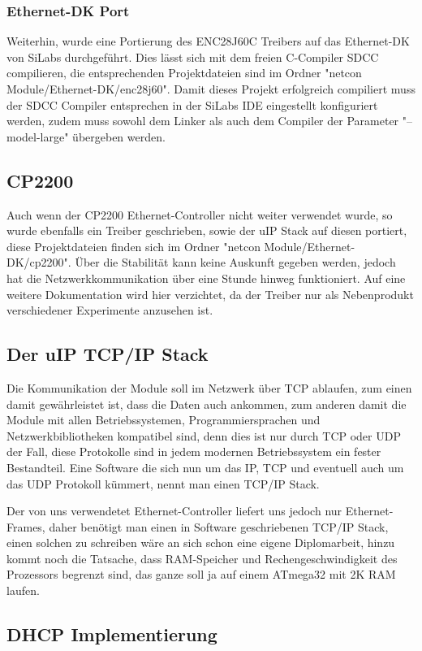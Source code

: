 \documentclass[a4paper,14pt,headsepline]{scrartcl}
\begin{document}
\subsubsection{Ethernet-DK Port}
Weiterhin, wurde eine Portierung des ENC28J60C Treibers auf das Ethernet-DK von SiLabs durchgeführt. Dies lässt sich mit dem freien C-Compiler SDCC compilieren, die entsprechenden Projektdateien sind im Ordner "netcon Module/Ethernet-DK/enc28j60". Damit dieses Projekt erfolgreich compiliert muss der SDCC Compiler entsprechen in der SiLabs IDE eingestellt konfiguriert werden, zudem muss sowohl dem Linker als auch dem Compiler der Parameter "--model-large" übergeben werden.

\subsection{CP2200}
Auch wenn der CP2200 Ethernet-Controller nicht weiter verwendet wurde, so wurde ebenfalls ein Treiber geschrieben, sowie der uIP Stack auf diesen portiert, diese Projektdateien finden sich im Ordner "netcon Module/Ethernet-DK/cp2200". Über die Stabilität kann keine Auskunft gegeben werden, jedoch hat die Netzwerkkommunikation über eine Stunde hinweg funktioniert. Auf eine weitere Dokumentation wird hier verzichtet, da der Treiber nur als Nebenprodukt verschiedener Experimente anzusehen ist.

\subsection{Der uIP TCP/IP Stack}
Die Kommunikation der Module soll im Netzwerk über TCP ablaufen, zum einen damit gewährleistet ist, dass die Daten auch ankommen, zum anderen damit die Module mit allen Betriebssystemen, Programmiersprachen und Netzwerkbibliotheken kompatibel sind, denn dies ist nur durch TCP oder UDP der Fall, diese Protokolle sind in jedem modernen Betriebssystem ein fester Bestandteil. Eine Software die sich nun um das IP, TCP und eventuell auch um das UDP Protokoll kümmert, nennt man einen TCP/IP Stack.

Der von uns verwendetet Ethernet-Controller liefert uns jedoch nur Ethernet-Frames, daher benötigt man einen in Software geschriebenen TCP/IP Stack, einen solchen zu schreiben wäre an sich schon eine eigene Diplomarbeit, hinzu kommt noch die Tatsache, dass RAM-Speicher und Rechengeschwindigkeit des Prozessors begrenzt sind, das ganze soll ja auf einem ATmega32 mit 2K RAM laufen.

\subsection{DHCP Implementierung}
\end{document}
